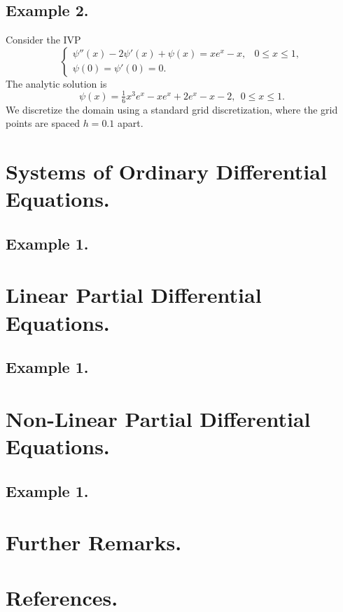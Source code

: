 \documentclass[10pt]{article}
\theoremstyle{plain}
\theoremstyle{definition}
\theoremstyle{remark}
\numberwithin{theorem}{section}
\numberwithin{proposition}{section}
\numberwithin{remark}{section}
\numberwithin{corollary}{section}
\numberwithin{definition}{section}
\numberwithin{lemma}{section}
\numberwithin{equation}{section}
\begin{document}
\subsection{Example 2.}
Consider the IVP 
\begin{equation}	
	\label{example 2, IVP}
	\displaystyle \begin{cases}
		\psi''(x) - 2\psi'(x) + \psi(x) = xe^x - x, & 0 \leq x \leq 1, \\
		\psi(0) = \psi'(0) = 0.
	\end{cases}
\end{equation}
The analytic solution is 
\begin{equation}	
	\label{example 2, analytic solution}
	\displaystyle \psi(x) = \tfrac{1}{6}x^3e^x - xe^x + 2e^x - x - 2, \:\: 0 \leq x \leq 1.
\end{equation}
We discretize the domain using a standard grid discretization, where the grid points are spaced $h = 0.1$ apart. 

\section{Systems of Ordinary Differential Equations.}
\subsection{Example 1.}
\section{Linear Partial Differential Equations.}
\subsection{Example 1.}
\section{Non-Linear Partial Differential Equations.}
\subsection{Example 1.}
\section{Further Remarks.}
\section{References.}
\end{document}
